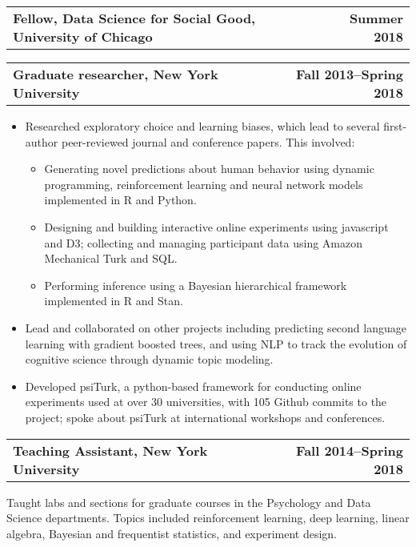 \documentclass[10pt]{resume}
\begin{document}
\begin{addmargin}[1em]{0em}
\begin{tabular}{@{} L M R}
  \textbf{Fellow, Data Science for Social Good, University of Chicago}& &\textbf{Summer 2018}\\
\end{tabular}\vspace{-1em}

\begin{tabular}{@{} L M R}
  \textbf{Graduate researcher, New York University}& &\textbf{Fall 2013--Spring 2018}\\
\end{tabular}\vspace{-1em}
\begin{itemize}[noitemsep,topsep=-10pt,leftmargin=*]
\item Researched exploratory choice and learning biases, which lead to several first-author peer-reviewed journal and conference papers. This involved:
  \begin{itemize}[noitemsep,topsep=0pt]
  \item Generating novel predictions about human behavior using dynamic programming,
    reinforcement learning and neural network models implemented in R and Python.
  \item Designing and building interactive online experiments using javascript and D3;
    collecting and managing participant data using Amazon Mechanical Turk and SQL.
  \item Performing inference using a Bayesian hierarchical framework implemented in R and Stan.
  \end{itemize}
\item Lead and collaborated on other projects including predicting second language learning
  with gradient boosted trees, and using NLP to track the evolution of cognitive
  science through dynamic topic modeling.
\item Developed psiTurk, a python-based framework for
  conducting online experiments used at over 30 universities, with 105 Github commits to the project; spoke
  about psiTurk at international workshops and conferences.\vspace{1em}
\end{itemize}
  

\begin{tabular}{@{} L M R}
  \textbf{Teaching Assistant, New York University}& &\textbf{Fall 2014--Spring 2018}\\
\end{tabular}\vspace{-1em}
  Taught labs and sections for graduate courses in the Psychology and
  Data Science departments. Topics included reinforcement learning, deep learning, linear algebra, Bayesian
  and frequentist statistics, and experiment design.


\end{addmargin}
\end{document}
